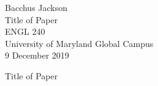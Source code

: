 \documentclass[12pt]{report}
\def \paperauthor {Bacchus Jackson}
\def \papertitle {Title of Paper}
\def \paperclass {ENGL 240}
\def \paperschool {University of Maryland Global Campus}
\def \paperdate {9 December 2019}
\begin{document}
\fancyhead[L]{}

\begin{flushleft}
    \paperauthor\\
    \papertitle\\
    \paperclass\\
    \paperschool\\
    \paperdate

\end{flushleft}

\begin{center}
    \papertitle
\end{center}

\lipsum[4]
\end{document}
